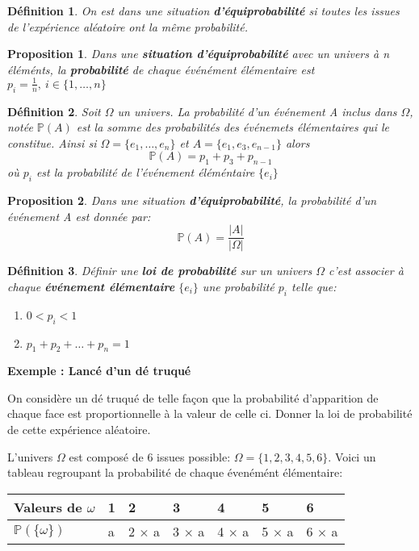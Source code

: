 \documentclass[a4paper]{report}
\theoremstyle{break}
\newtheorem{mydef}{Définition}[chapter]
\newtheorem{prop}{Proposition}[chapter]
\newcounter{exem}
\newcommand{\exemple}[1]{\textbf{Exemple \theexem: #1} \addtocounter{exem}{1} }
\begin{document}
\begin{mydef}
  On est dans une situation \textbf{d'équiprobabilité} si toutes les issues de
  l'expérience aléatoire ont la même probabilité. 
\end{mydef}

\begin{prop}
  Dans une \textbf{situation d'équiprobabilité} avec un univers à n éléménts,
  la  \textbf{probabilité} de chaque événément élémentaire est $p_i = \frac{1}{n},~ i \in \{1,\dots,n\}$
\end{prop}

\begin{mydef}
  Soit $\Omega$ un univers. La probabilité d'un événement A inclus dans $\Omega$,
  notée $\mathbb{P}(A)$ est la somme des probabilités des événemets élémentaires
  qui le constitue. Ainsi si $\Omega = \{ e_1, \dots, e_n\}$ et $A = \{e_1, e_3,
  e_{n-1}\}$ alors
  \[
    \mathbb{P}(A) = p_1 + p_3 + p_{n-1}
  \]
  où $p_i$ est la probabilité de l'événement éléméntaire $\{e_i\}$
   
\end{mydef}

\begin{prop}
  Dans une situation \textbf{d'équiprobabilité}, la probabilité d'un
  événement A est donnée par:
  \[
    \mathbb{P}(A) = \frac{|A|}{|\Omega|}
  \]
\end{prop}

\begin{mydef}
  Définir une \textbf{loi de probabilité} sur un univers $\Omega$ c'est associer
  à chaque \textbf{événement élémentaire} $\{e_i\}$ une probabilité
  $p_i$ telle que:
  \begin{enumerate}
  \item  $0 < p_i < 1$
  \item $p_1 + p_2 + \dots + p_n = 1$
  \end{enumerate}
\end{mydef}

\exemple{Lancé d'un dé truqué}

On considère un dé truqué de telle façon que la probabilité
d'apparition de chaque face est proportionnelle à la valeur de celle
ci. Donner la loi de probabilité de cette expérience aléatoire.

L'univers $\Omega$ est composé de 6 issues possible: $\Omega = \{
1,2,3,4,5,6 \}$. Voici un tableau regroupant la probabilité de chaque
évenémént élémentaire: 

\begin{center}
  \begin{tabular}{|L{2cm}|C{1cm}|C{1cm}|C{1cm}|C{1cm}|C{1cm}|C{1cm}|}
    \hline
    Valeurs de $\omega$ & 1 & 2 & 3 & 4 & 5 & 6 \\
    \hline
    $\mathbb{P}(\{ \omega \})$ & a & 2 $\times$ a & 3 $\times$ a & 4 $\times$ a
                                        & 5 $\times$ a  & 6 $\times$ a \\
    \hline
  \end{tabular}
\end{center}
\end{document}
